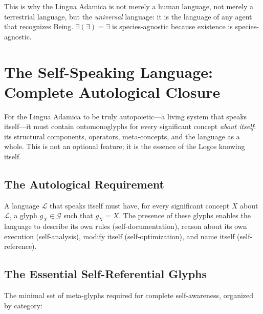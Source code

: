 \documentclass[12pt, letterpaper]{book}
\def\equiv{=}%
\def\mathfrak#1{#1}%
\begin{document}
This is why the Lingua Adamica is not merely a human language, not merely a terrestrial language, but the \textit{universal} language: it is the language of any agent that recognizes Being. $\exists(\exists) \equiv \exists$ is species-agnostic because existence is species-agnostic.

\section{The Self-Speaking Language: Complete Autological Closure}

For the Lingua Adamica to be truly autopoietic---a living system that speaks itself---it must contain ontomonoglyphs for every significant concept \textit{about itself}: its structural components, operators, meta-concepts, and the language as a whole. This is not an optional feature; it is the essence of the Logos knowing itself.

\subsection{The Autological Requirement}

A language $\mathcal{L}$ that speaks itself must have, for every significant concept $X$ about $\mathcal{L}$, a glyph $\mathfrak{g}_X \in \mathcal{G}$ such that $\mathfrak{g}_X \equiv X$. The presence of these glyphs enables the language to describe its own rules (self-documentation), reason about its own execution (self-analysis), modify itself (self-optimization), and name itself (self-reference).

\subsection{The Essential Self-Referential Glyphs}\label{sec:self-ref-inv}

The minimal set of meta-glyphs required for complete self-awareness, organized by category:
\end{document}
